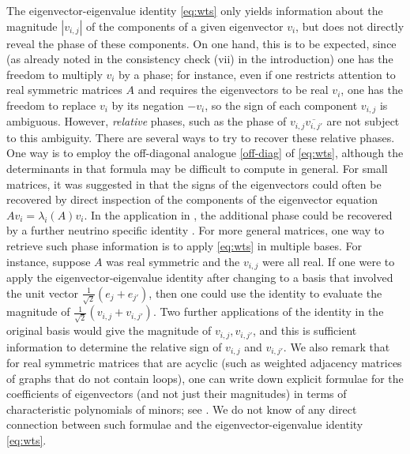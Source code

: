 \documentclass{amsart}
\begin{document}
The eigenvector-eigenvalue identity \eqref{eq:wts} only yields information about the magnitude $|v_{i,j}|$ of the components of a given eigenvector $v_i$, but does not directly reveal the phase of these components.  On one hand, this is to be expected, since (as already noted in the consistency check (vii) in the introduction) one has the freedom to multiply $v_i$ by a phase; for instance, even if one restricts attention to real symmetric matrices $A$ and requires the eigenvectors to be real $v_i$, one has the freedom to replace $v_i$ by its negation $-v_i$, so the sign of each component $v_{i,j}$ is ambiguous.  However, \emph{relative} phases, such as the phase of $v_{i,j} \overline{v_{i,j'}}$ are not subject to this ambiguity.  There are several ways to try to recover these relative phases.  One way is to employ the off-diagonal analogue \eqref{off-diag} of \eqref{eq:wts}, although the determinants in that formula may be difficult to compute in general.  For small matrices, it was suggested in \cite{Mukherjee1989} that the signs of the eigenvectors could often be recovered by direct inspection of the components of the eigenvector equation $A v_i = \lambda_i(A) v_i$.  In the application in \cite{Denton:2019ovn}, the additional phase could be recovered by a further neutrino specific identity \cite{Toshev:1991ku}.  For more general matrices, one way to retrieve such phase information is to apply \eqref{eq:wts} in multiple bases.  For instance, suppose $A$ was real symmetric and the $v_{i,j}$ were all real.  If one were to apply the eigenvector-eigenvalue identity after changing to a basis that involved the unit vector $\frac{1}{\sqrt{2}} (e_j + e_{j'})$, then one could use the identity to evaluate the magnitude of $\frac{1}{\sqrt{2}} ( v_{i,j} + v_{i,j'} )$.  Two further applications of the identity in the original basis would give the magnitude of $v_{i,j}, v_{i,j'}$, and this is sufficient information to determine the relative sign of $v_{i,j}$ and $v_{i,j'}$.  We also remark that for real symmetric matrices that are acyclic (such as weighted adjacency matrices of graphs that do not contain loops), one can write down explicit formulae for the coefficients of eigenvectors (and not just their magnitudes) in terms of characteristic polynomials of minors; see \cite{BK}.  We do not know of any direct connection between such formulae and the eigenvector-eigenvalue identity \eqref{eq:wts}.
\end{document}
